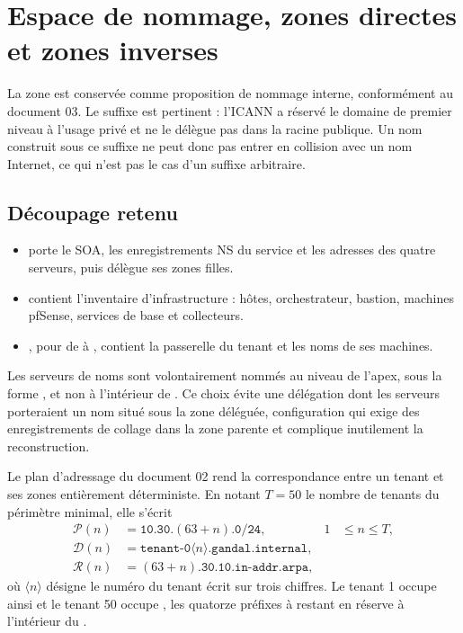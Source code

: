 \section{Espace de nommage, zones directes et zones inverses}
\label{sec:nommage}

La zone  est conservée comme proposition de nommage
interne, conformément au document 03. Le suffixe est pertinent : l'ICANN a
réservé le domaine de premier niveau  à l'usage privé et ne le
délègue pas dans la racine publique. Un nom construit sous ce suffixe ne peut
donc pas entrer en collision avec un nom Internet, ce qui n'est pas le cas d'un
suffixe arbitraire.

\subsection{Découpage retenu}

\begin{itemize}
  \item {} porte le SOA, les enregistrements NS du service
    et les adresses des quatre serveurs, puis délègue ses zones filles.
  \item {} contient l'inventaire d'infrastructure :
    hôtes, orchestrateur, bastion, machines pfSense, services de base et
    collecteurs.
  \item {}, pour  de  à
    , contient la passerelle du tenant et les noms de ses machines.
\end{itemize}

Les serveurs de noms sont volontairement nommés au niveau de l'apex, sous la
forme , et non à l'intérieur de
. Ce choix évite une délégation dont les serveurs
porteraient un nom situé sous la zone déléguée, configuration qui exige des
enregistrements de collage dans la zone parente et complique inutilement la
reconstruction.

Le plan d'adressage du document 02 rend la correspondance entre un tenant et ses
zones entièrement déterministe. En notant $T=50$ le nombre de tenants du
périmètre minimal, elle s'écrit
\begin{align}
  \mathcal{P}(n) &= \texttt{10.30.}(63+n)\texttt{.0/24},
    & 1 &\leqslant n \leqslant T, \label{eq:prefixe}\\[2pt]
  \mathcal{D}(n) &= \texttt{tenant-0}\langle n\rangle\texttt{.gandal.internal},
    \label{eq:directe}\\[2pt]
  \mathcal{R}(n) &= (63+n)\texttt{.30.10.in-addr.arpa},
    \label{eq:inverse}
\end{align}
où $\langle n\rangle$ désigne le numéro du tenant écrit sur trois chiffres. Le
tenant 1 occupe ainsi  et le tenant 50 occupe
, les quatorze préfixes  à
 restant en réserve à l'intérieur du .

